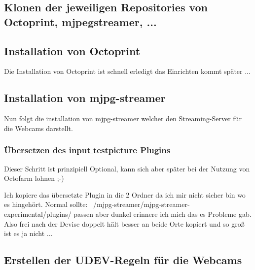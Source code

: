 \subsection{Klonen der jeweiligen Repositories von Octoprint, mjpegstreamer, ...}



\subsection{Installation von Octoprint}

Die Installation von Octoprint ist schnell erledigt das Einrichten kommt später ...

\subsection{Installation von mjpg-streamer}

Nun folgt die installation von mjpg-streamer welcher den Streaming-Server für die Webcams darstellt. \\


\subsubsection{Übersetzen des input$\_$testpicture Plugins}

Dieser Schritt ist prinzipiell Optional, kann sich aber später bei der Nutzung von Octofarm lohnen ;-)


Ich kopiere das übersetzte Plugin in die 2 Ordner da ich mir nicht sicher bin wo es hingehört. Normal sollte: ~/mjpg-streamer/mjpg-streamer-experimental/plugins/ passen aber dunkel erinnere ich mich das es Probleme gab. Also frei nach der Devise doppelt hält besser an beide Orte kopiert und so groß ist es ja nicht ...

\subsection{Erstellen der UDEV-Regeln für die Webcams}
